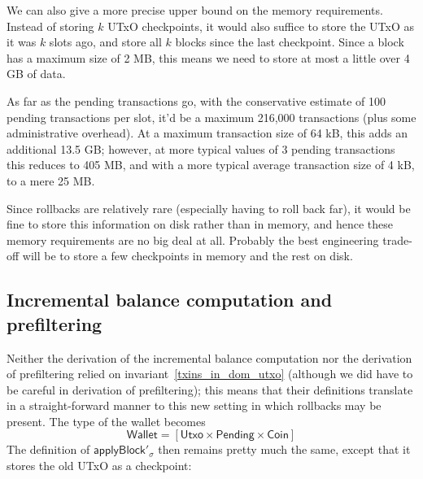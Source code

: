 \documentclass{article}
\begin{document}

We can also give a more precise upper bound on the memory requirements. Instead
of storing $k$ UTxO checkpoints, it would also suffice to store the UTxO as it
was $k$ slots ago, and store all $k$ blocks since the last checkpoint. Since a
block has a maximum size of 2 MB, this means we need to store at most a little
over 4 GB of data.

As far as the pending transactions go, with the conservative estimate of 100
pending transactions per slot, it'd be a maximum 216,000 transactions (plus some
administrative overhead). At a maximum transaction size of 64 kB, this adds an
additional 13.5 GB; however, at more typical values of 3 pending transactions
this reduces to 405 MB, and with a more typical average transaction size of 4
kB, to a mere 25 MB.

Since rollbacks are relatively rare (especially having to roll back far), it
would be fine to store this information on disk rather than in memory, and hence
these memory requirements are no big deal at all. Probably the best engineering
trade-off will be to store a few checkpoints in memory and the rest on disk.

\subsection{Incremental balance computation and prefiltering}

Neither the derivation of the incremental balance computation nor the derivation
of prefiltering relied on invariant~\eqref{txins_in_dom_utxo} (although we did
have to be careful in derivation of prefiltering); this means that their
definitions translate in a straight-forward manner to this new setting in which
rollbacks may be present. The type of the wallet becomes
%
\begin{equation*}
\mathsf{Wallet} = [\mathsf{Utxo} \times \mathsf{Pending} \times \mathsf{Coin}]
\end{equation*}
%
The definition of $\mathsf{applyBlock}'_\sigma$ then remains pretty much the
same, except that it stores the old UTxO as a checkpoint:
\end{document}
